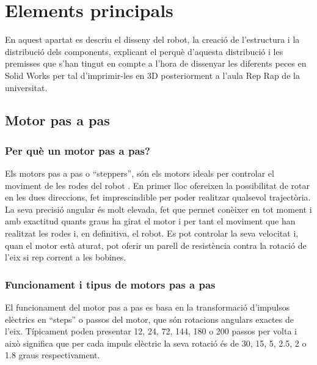 \setlength\topmargin{8mm}
\onehalfspacing
\chapter{Elements principals} %

\label{Chapter3} %


En aquest apartat es descriu el disseny del robot, la creació de l’estructura i la distribució dels components, explicant el perquè d’aquesta distribució i les premisses que s’han tingut en compte a l'hora de dissenyar les diferents peces en Solid Works per tal d'imprimir-les en 3D posteriorment a l'aula Rep Rap de la universitat.   

\section{Motor pas a pas}
\subsection{Per què un motor pas a pas?}

Els motors pas a pas o “steppers”, són els motors ideals per controlar el moviment de les rodes del robot \cite{billschweber2015}. En primer lloc ofereixen la possibilitat de rotar en les dues direccions, fet imprescindible per poder realitzar qualsevol trajectòria. La seva precisió angular és molt elevada, fet que permet conèixer en tot moment i amb exactitud quants graus ha girat el motor i per tant el moviment que han realitzat les rodes i, en definitiva, el robot. Es pot controlar la seva velocitat i, quan el motor està aturat, pot oferir un parell de resistència contra la rotació de l'eix si rep corrent a les bobines. 


\subsection{Funcionament i tipus de motors pas a pas}
El funcionament del motor pas a pas es basa en la transformació d'impulsos elèctrics en “steps” o passos del motor, que són rotacions angulars exactes de l'eix. Típicament poden presentar 12, 24, 72, 144, 180 o 200 passos per volta i això significa que per cada impuls elèctric la seva rotació és de 30, 15, 5, 2.5, 2 o 1.8 graus respectivament. 

